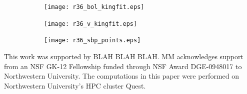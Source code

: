 \documentclass[12pt,preprint]{aastex}
\begin{document}
\begin{figure}
	\begin{subfigure}[b]{0.3\textwidth}
		\texttt{[image: r36\_bol\_kingfit.eps]}	
	\end{subfigure}
	\begin{subfigure}[b]{0.3\textwidth}
		\texttt{[image: r36\_v\_kingfit.eps]}	
	\end{subfigure}
	\begin{subfigure}[b]{0.3\textwidth}
		\texttt{[image: r36\_sbp\_points.eps]}	
	\end{subfigure}

\end{figure}



\acknowledgements

This work was supported by BLAH BLAH BLAH. %
MM acknowledges support from an NSF GK-12 Fellowship
funded through NSF Award DGE-0948017 to Northwestern University.  The
computations in this paper were performed on Northwestern University's
HPC cluster Quest.



\clearpage

 
\end{document}
